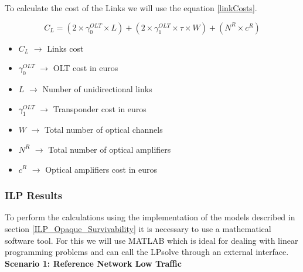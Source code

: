 \vspace{11pt}

To calculate the cost of the Links we will use the equation \ref{linkCosts}.

\begin{equation}
C_L = \left(2 \times \gamma_0^{OLT} \times L\right) + \left(2 \times \gamma_1^{OLT} \times \tau \times W\right) + \left(N^R \times c^R\right)
\label{linkCosts}
\end{equation}	
	
\begin{itemize}
\item{$C_L$				$\rightarrow$	Links cost}
\item{$\gamma_0^{OLT}$	$\rightarrow$	OLT cost in euros}
\item{$L$				$\rightarrow$	Number of unidirectional links}
\item{$\gamma_1^{OLT}$	$\rightarrow$	Transponder cost in euros}
\item{$W$             $\rightarrow$	    Total number of optical channels}
\item{$N^R$				$\rightarrow$	Total number of optical amplifiers}
\item{$c^R$				$\rightarrow$	Optical amplifiers cost in euros}
\end{itemize}

\subsubsection{ILP Results}

To perform the calculations using the implementation of the models described in section \ref{ILP_Opaque_Survivability} it is necessary to use a mathematical software tool. For this we will use MATLAB which is ideal for dealing with linear programming problems and can call the LPsolve through an external interface. \\

\textbf{Scenario 1: Reference Network Low Traffic} \label{Scenario1_opaque} \\

